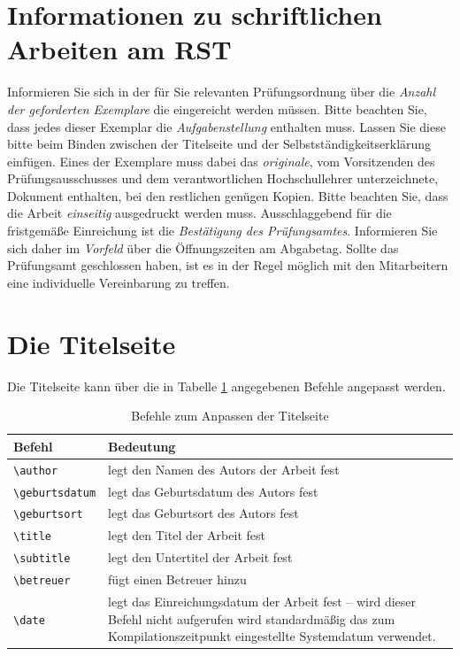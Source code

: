 \section{Informationen zu schriftlichen Arbeiten am RST}
Informieren Sie sich in der für Sie relevanten Prüfungsordnung über die \emph{Anzahl der geforderten Exemplare} die eingereicht werden müssen. Bitte beachten Sie, dass jedes dieser Exemplar die \emph{Aufgabenstellung} enthalten muss. Lassen Sie diese bitte beim Binden zwischen der Titelseite und der Selbstständigkeitserklärung einfügen. Eines der Exemplare muss dabei das \emph{originale}, vom Vorsitzenden des Prüfungsausschusses und dem verantwortlichen Hochschullehrer unterzeichnete, Dokument enthalten, bei den restlichen genügen Kopien. Bitte beachten Sie, dass die Arbeit \emph{einseitig} ausgedruckt werden muss. Ausschlaggebend für die fristgemäße Einreichung ist die \emph{Bestätigung des Prüfungsamtes}. Informieren Sie sich daher im \emph{Vorfeld} über die Öffnungszeiten am Abgabetag. Sollte das Prüfungsamt geschlossen haben, ist es in der Regel möglich mit den Mitarbeitern eine individuelle Vereinbarung zu treffen.


\section{Die Titelseite}
Die Titelseite kann über die in Tabelle \ref{tab:titel} angegebenen Befehle angepasst werden.
\begin{table}[htbp]
\caption{Befehle zum Anpassen der Titelseite}
\label{tab:titel}
\begin{tabular}{lp{12cm}}
Befehl & Bedeutung\\
\toprule
\verb|\author| & legt den Namen des Autors der Arbeit fest\\
\verb|\geburtsdatum| & legt das Geburtsdatum des Autors fest\\
\verb|\geburtsort| & legt das Geburtsort des Autors fest\\
\verb|\title| & legt den Titel der Arbeit fest\\
\verb|\subtitle| & legt den Untertitel der Arbeit fest\\
\verb|\betreuer| & fügt einen Betreuer hinzu\\
\verb|\date| & legt das Einreichungsdatum der Arbeit fest -- \newline wird dieser Befehl nicht aufgerufen wird standardmäßig das zum Kompilationszeitpunkt eingestellte Systemdatum verwendet.\\
\bottomrule
\end{tabular}
\end{table}



